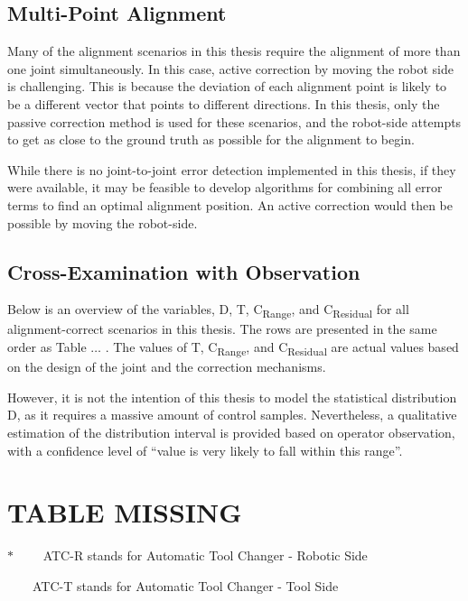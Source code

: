 \subsection{Multi-Point Alignment}

Many of the alignment scenarios in this thesis require the alignment of more than one joint simultaneously. In this case, active correction by moving the robot side is challenging. This is because the deviation of each alignment point is likely to be a different vector that points to different directions. In this thesis, only the passive correction method is used for these scenarios, and the robot-side attempts to get as close to the ground truth as possible for the alignment to begin. 

While there is no joint-to-joint error detection implemented in this thesis, if they were available, it may be feasible to develop algorithms for combining all error terms to find an optimal alignment position. An active correction would then be possible by moving the robot-side.

\subsection{Cross-Examination with Observation}

Below is an overview of the variables, D, T, C\textsubscript{Range}, and C\textsubscript{Residual} for all alignment-correct scenarios in this thesis. The rows are presented in the same order as Table $\ldots$ . The values of T, C\textsubscript{Range}, and C\textsubscript{Residual }are actual values based on the design of the joint and the correction mechanisms. 

However, it is not the intention of this thesis to model the statistical distribution D, as it requires a massive amount of control samples. Nevertheless, a qualitative estimation of the distribution interval is provided based on operator observation, with a confidence level of ``value is very likely to fall within this range''.

\section{TABLE MISSING}

\vspace{2\baselineskip}
{\footnotesize $\ast$ \ \ \ \ ATC-R stands for Automatic Tool Changer - Robotic Side}

{\footnotesize \ \ \ \ ATC-T stands for Automatic Tool Changer - Tool Side}

